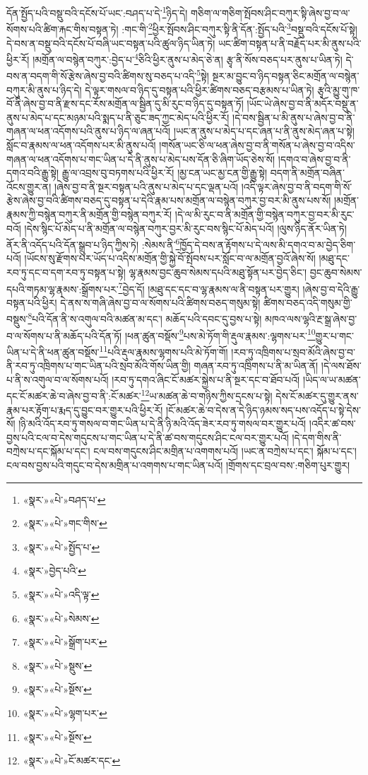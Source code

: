 དོན་སྤྱོད་པའི་བསྡུ་བའི་དངོས་པོ་ཡང་:བཤད་པ་དེ་\footnote{«སྣར་»«པེ་»བཤད་པ་}ཉིད་དེ། གཅིག་ལ་གཅིག་སྤོབས་ཤིང་བཀུར་སྟི་ཞེས་བྱ་བ་ལ་སོགས་པའི་ཚིག་རྐང་གིས་བསྟན་ཏེ། :གང་གི་\footnote{«སྣར་»«པེ་»གང་གིས་}ཕྱིར་སྤོབས་ཤིང་བཀུར་སྟི་ནི་དོན་:སྤྱོད་པའི་\footnote{«སྣར་»«པེ་»སྤྱོད་པ་}བསྡུ་བའི་དངོས་པོ་སྟེ། དེ་བས་ན་བསྡུ་བའི་དངོས་པོ་བཞི་ཡང་བསྟན་པའི་ཚུལ་ཉིད་ཡིན་ཏེ། ཡང་ཚིག་བསྟན་པ་ནི་བརྗོད་པར་མི་ནུས་པའི་ཕྱིར་རོ། །མགྲོན་ལ་བསྙེན་བཀུར་:བྱེད་པ་\footnote{«སྣར་»བྱེད་པའི་}ཅིའི་ཕྱིར་ནུས་པ་མེད་ཅེ་ན། རྩྭ་ནི་སོས་བཅད་པར་ནུས་པ་ཡིན་ཏེ། དེ་བས་ན་བདག་གི་སོ་རྩེས་ཞེས་བྱ་བའི་ཚིགས་སུ་བཅད་པ་འདི་\footnote{«སྣར་»«པེ་»འདི་ལྟ་}སྟེ། སྔར་མ་བྱུང་བ་ཉིད་བསྟན་ཅིང་མགྲོན་ལ་བསྙེན་བཀུར་མི་ནུས་པ་ཉིད་དེ། དེ་ལྟར་གསལ་བ་ཉིད་དུ་བསྟན་པའི་ཕྱིར་ཚིགས་བཅད་བརྩམས་པ་ཡིན་ཏེ། རྩྭའི་མྱུ་གུ་ཁ་བོ་ནི་ཞེས་བྱ་བ་ནི་རྫས་དང་རོས་མགྲོན་ལ་སྦྱིན་དུ་མི་རུང་བ་ཉིད་དུ་བསྟན་ཏོ། །ཡོང་ཡེ་ཞེས་བྱ་བ་ནི་མདོར་བསྡུ་ན་ནུས་པ་མེད་པ་དང་མཉམ་པའི་སྨད་པ་ནི་ཅུང་ཟད་ཀྱང་མེད་པའི་ཕྱིར་རོ། །དེ་བས་སྦྱིན་པ་མི་ནུས་པ་ཞེས་བྱ་བ་ནི་གཞན་ལ་ཕན་འདོགས་པའི་ནུས་པ་ཉིད་ལ་ཞན་པའོ། །ཡང་ན་ནུས་པ་མེད་པ་དང་ཞན་པ་ནི་ནུས་མེད་ཞན་པ་སྟེ། སློང་བ་རྣམས་ལ་ཕན་འདོགས་པར་མི་ནུས་པའོ། །གསོན་ཡང་ཅི་ལ་ཕན་ཞེས་བྱ་བ་ནི་གསོན་པ་ཞེས་བྱ་བ་འདིས་གཞན་ལ་ཕན་འདོགས་པ་གང་ཡིན་པ་དེ་ནི་ནུས་པ་མེད་པས་དོན་ཅི་ཞིག་ཡོད་ཅེས་སོ། །དགའ་བ་ཞེས་བྱ་བ་ནི་དགའ་བའི་རྒྱུ་སྟེ། རྒྱུ་ལ་འབྲས་བུ་བཏགས་པའི་ཕྱིར་རོ། །མྱ་ངན་ཡང་མྱ་ངན་གྱི་རྒྱུ་སྟེ། བདག་ནི་མགྲོན་བཞིན་འོངས་གྱུར་ན། །ཞེས་བྱ་བ་ནི་སྔར་བསྟན་པའི་ནུས་པ་མེད་པ་དང་ལྡན་པའོ། །འདི་ལྟར་ཞེས་བྱ་བ་ནི་བདག་གི་སོ་རྩེས་ཞེས་བྱ་བའི་ཚིགས་བཅད་དུ་བསྟན་པ་དེའི་རྣམ་པས་མགྲོན་ལ་བསྙེན་བཀུར་བྱ་བར་མི་ནུས་པས་སོ། །མགྲོན་རྣམས་ཀྱི་བསྙེན་བཀུར་ནི་མགྲོན་གྱི་བསྙེན་བཀུར་རོ། །དེ་ལ་མི་རུང་བ་ནི་མགྲོན་གྱི་བསྙེན་བཀུར་བྱ་བར་མི་རུང་བའོ། །དེས་སྙིང་པོ་མེད་པ་ནི་མགྲོན་ལ་བསྙེན་བཀུར་བྱར་མི་རུང་བས་སྙིང་པོ་མེད་པའོ། །ལུས་ཉིད་ནོར་ཡིན་ཏེ། ནོར་ནི་འདོད་པའི་དོན་སྒྲུབ་པ་ཉིད་ཀྱིས་ཏེ། :སེམས་ནི་\footnote{«སྣར་»«པེ་»སེམས་}ཁྱོད་དེ་བས་ན་རྟོགས་པ་དེ་ལས་མི་དགའ་བ་མ་བྱེད་ཅིག་པའོ། །ཡོངས་སུ་རྫོགས་པར་ཡོད་པ་འདིས་མགྲོན་གྱི་སྐྱེ་བོ་སྤོབས་པར་སློང་བ་ལ་མགྲོན་བྱའོ་ཞེས་སོ། །མཐུ་དང་རབ་ཏུ་དང་བ་དག་རབ་ཏུ་བསྟན་པ་སྟེ། ལྷ་རྣམས་བྱང་ཆུབ་སེམས་དཔའི་མཐུ་སྟོན་པར་བྱེད་ཅིང་། བྱང་ཆུབ་སེམས་དཔའི་གཏམ་ལྷ་རྣམས་:སྒྲོགས་པར་\footnote{«སྣར་»«པེ་»སྒྲོག་པར་}བྱེད་དོ། །མཐུ་དང་དང་བ་ལྷ་རྣམས་ལ་ནི་བསྟན་པར་གྱུར། །ཞེས་བྱ་བ་དེའི་རྒྱུ་བསྟན་པའི་ཕྱིར། དེ་ནས་ས་གཞི་ཞེས་བྱ་བ་ལ་སོགས་པའི་ཚིགས་བཅད་གསུམ་སྟེ། ཚིགས་བཅད་འདི་གསུམ་གྱི་བསྡུས་\footnote{«སྣར་»«པེ་»སྡུས་}པའི་དོན་ནི་ས་འགུལ་བའི་མཚན་མ་དང་། མཆོད་པའི་དབང་དུ་བྱས་པ་སྟེ། མཁའ་ལས་ལྷའི་རྔ་སྒྲ་ཞེས་བྱ་བ་ལ་སོགས་པ་ནི་མཆོད་པའི་དོན་ཏོ། །ཕན་ཚུན་བསྡོས་\footnote{«སྣར་»«པེ་»སྔོས་}པས་མེ་ཏོག་གི་རྡུལ་རྣམས་:ལྷགས་པར་\footnote{«སྣར་»«པེ་»ལྷག་པར་}གྱུར་པ་གང་ཡིན་པ་དེ་ནི་ཕན་ཚུན་བསྡོས་\footnote{«སྣར་»«པེ་»སྔོས་}པའི་རྡུལ་རྣམས་ལྷགས་པའི་མེ་ཏོག་གོ། །རབ་ཏུ་འཁྲིགས་པ་སྲབ་མོའི་ཞེས་བྱ་བ་ནི་རབ་ཏུ་འཁྲིགས་པ་གང་ཡིན་པའི་སྲབ་མོའི་གོས་ཡིན་གྱི། གཞན་རབ་ཏུ་འཁྲིགས་པ་ནི་མ་ཡིན་ནོ། །དེ་ལས་ཐོས་པ་ནི་ས་འགུལ་བ་ལ་སོགས་པའོ། །རབ་ཏུ་དགའ་ཞིང་ངོ་མཚར་སྐྱེས་པ་ནི་སྔར་དང་བ་ཐོབ་པའོ། །ཡིད་ལ་ཡ་མཚན་དང་ངོ་མཚར་ཆེ་བ་ཞེས་བྱ་བ་ནི་:ངོ་མཚར་\footnote{«སྣར་»«པེ་»ངོ་མཚར་དང་}ཡ་མཚན་ཆེ་བ་གཉིས་ཀྱིས་དྲངས་པ་སྟེ། དེས་ངོ་མཚར་དུ་གྱུར་ནས་རྣམ་པར་རྟོག་པ་རྨད་དུ་བྱུང་བར་གྱུར་པའི་ཕྱིར་རོ། །ངོ་མཚར་ཆེ་བ་དེས་ན་དེ་ཉིད་ཉམས་སད་པས་འདོད་པ་སྟེ་དེས་སོ། །ཉི་མའི་འོད་རབ་ཏུ་གསལ་བ་གང་ཡིན་པ་དེ་ནི་ཉི་མའི་འོད་ཟེར་རབ་ཏུ་གསལ་བར་གྱུར་པའོ། །འདིར་ཚ་བས་བྱས་པའི་ངལ་བ་དེས་གདུངས་པ་གང་ཡིན་པ་དེ་ནི་ཚ་བས་གདུངས་ཤིང་ངལ་བར་གྱུར་པའོ། །དེ་དག་གིས་ནི་བཀྲེས་པ་དང་སྐོམ་པ་དང་། ངལ་བས་གདུངས་ཤིང་མགྲིན་པ་འགགས་པའོ། །ཡང་ན་བཀྲེས་པ་དང་། སྐོམ་པ་དང་། ངལ་བས་བྱས་པའི་གདུང་བ་དེས་མགྲིན་པ་འགགས་པ་གང་ཡིན་པའོ། །གྲོགས་དང་བྲལ་བས་:གཅིག་པུར་གྱུར། 